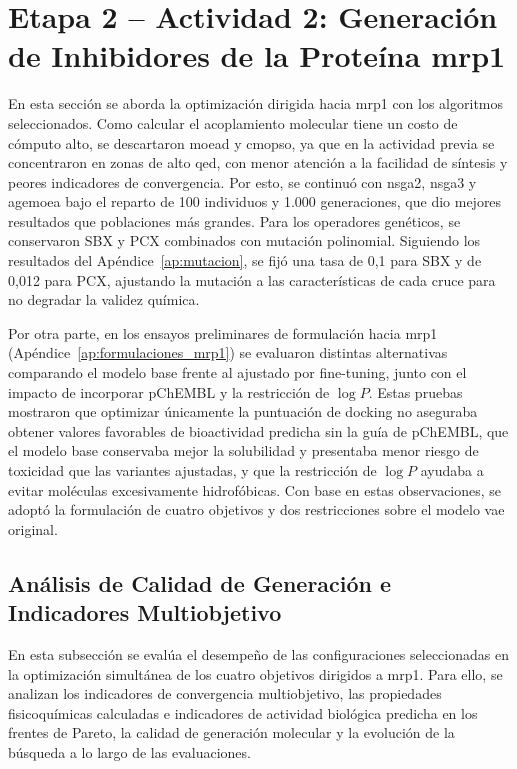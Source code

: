 \section{Etapa 2 -- Actividad 2: Generación de Inhibidores de la Proteína \texorpdfstring{\acrshort{mrp1}}{MRP1}}
\label{sec:res_mrp1}

En esta sección se aborda la optimización dirigida hacia \gls{mrp1} con los algoritmos seleccionados. Como calcular el acoplamiento molecular tiene un costo de cómputo alto, se descartaron \acrshort{moead} y \acrshort{cmopso}, ya que en la actividad previa se concentraron en zonas de alto \gls{qed}, con menor atención a la facilidad de síntesis y peores indicadores de convergencia. Por esto, se continuó con \acrshort{nsga2}, \acrshort{nsga3} y \acrshort{agemoea} bajo el reparto de 100 individuos y 1.000 generaciones, que dio mejores resultados que poblaciones más grandes. Para los operadores genéticos, se conservaron SBX y PCX combinados con mutación polinomial. Siguiendo los resultados del Apéndice~\ref{ap:mutacion}, se fijó una tasa de 0,1 para SBX y de 0,012 para PCX, ajustando la mutación a las características de cada cruce para no degradar la validez química.

Por otra parte, en los ensayos preliminares de formulación hacia \gls{mrp1} (Apéndice~\ref{ap:formulaciones_mrp1}) se evaluaron distintas alternativas comparando el modelo base frente al ajustado por fine-tuning, junto con el impacto de incorporar pChEMBL y la restricción de $\log P$. Estas pruebas mostraron que optimizar únicamente la puntuación de docking no aseguraba obtener valores favorables de bioactividad predicha sin la guía de pChEMBL, que el modelo base conservaba mejor la solubilidad y presentaba menor riesgo de toxicidad que las variantes ajustadas, y que la restricción de $\log P$ ayudaba a evitar moléculas excesivamente hidrofóbicas. Con base en estas observaciones, se adoptó la formulación de cuatro objetivos y dos restricciones sobre el modelo \gls{vae} original.

\subsection{Análisis de Calidad de Generación e Indicadores Multiobjetivo}
\label{subsec:calidad_gen_mrp1}

En esta subsección se evalúa el desempeño de las configuraciones seleccionadas en la optimización simultánea de los cuatro objetivos dirigidos a \gls{mrp1}. Para ello, se analizan los indicadores de convergencia multiobjetivo, las propiedades fisicoquímicas calculadas e indicadores de actividad biológica predicha en los frentes de Pareto, la calidad de generación molecular y la evolución de la búsqueda a lo largo de las evaluaciones.

